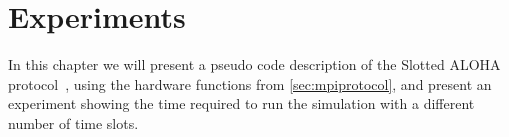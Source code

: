 \chapter{Experiments}\label{ch:experiments}
In this chapter we will present a pseudo code description of the Slotted ALOHA protocol~\cite{Roberts:1975:APS:1024916.1024920}, using the hardware functions from \autoref{sec:mpiprotocol}, and present an experiment showing the time required to run the simulation with a different number of time slots.

